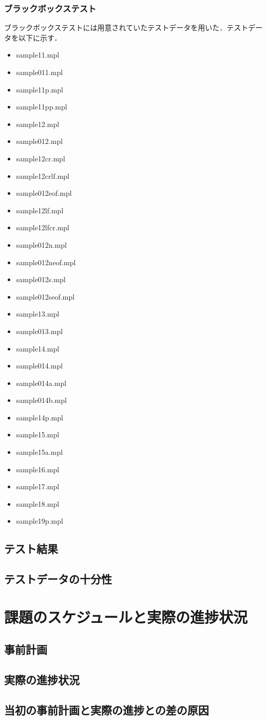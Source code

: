 \documentclass{jlreq}
\begin{document}
\subsubsection{ブラックボックステスト}
ブラックボックステストには用意されていたテストデータを用いた．テストデータを以下に示す．
\begin{itemize}
  \item sample11.mpl
  \item sample011.mpl
  \item sample11p.mpl
  \item sample11pp.mpl
  \item sample12.mpl
  \item sample012.mpl
  \item sample12cr.mpl
  \item sample12crlf.mpl
  \item sample012eof.mpl
  \item sample12lf.mpl
  \item sample12lfcr.mpl
  \item sample012n.mpl
  \item sample012neof.mpl
  \item sample012s.mpl
  \item sample012seof.mpl
  \item sample13.mpl
  \item sample013.mpl
  \item sample14.mpl
  \item sample014.mpl
  \item sample014a.mpl
  \item sample014b.mpl
  \item sample14p.mpl
  \item sample15.mpl
  \item sample15a.mpl
  \item sample16.mpl
  \item sample17.mpl
  \item sample18.mpl
  \item sample19p.mpl
\end{itemize}

\subsection{テスト結果}
\subsection{テストデータの十分性}

\section{課題のスケジュールと実際の進捗状況}

\subsection{事前計画}
\subsection{実際の進捗状況}
\subsection{当初の事前計画と実際の進捗との差の原因}
\end{document}
